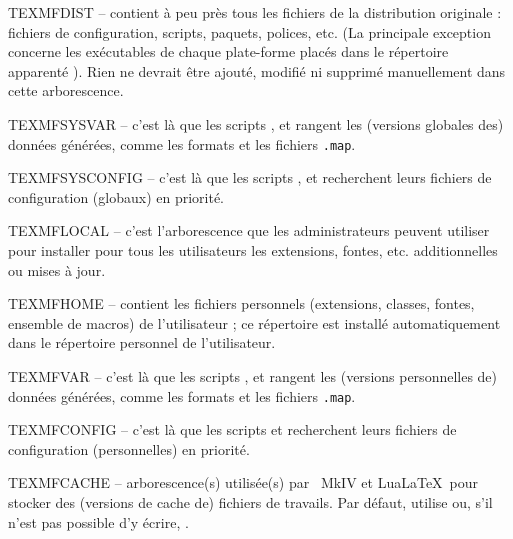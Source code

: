 \documentclass[german, english, french]{article}
\begin{document}
\begin{ttdescription}
\item[TEXMFDIST] -- contient à peu près tous les fichiers de la distribution
  originale : fichiers de configuration, scripts, paquets, polices, etc. (La
  principale exception concerne les exécutables de chaque plate-forme placés
  dans le répertoire apparenté ).  Rien ne devrait être ajouté,
  modifié ni supprimé manuellement dans cette arborescence.
\item[TEXMFSYSVAR] -- c'est là que les scripts ,
   et  rangent les (versions globales
  des) données générées, comme les formats et les fichiers \verb+.map+.
\item[TEXMFSYSCONFIG] -- c'est là que les scripts ,
   et  recherchent leurs fichiers de
  configuration (globaux) en priorité.
\item[TEXMFLOCAL] -- c'est l'arborescence que les administrateurs peuvent
  utiliser pour installer pour tous les utilisateurs les extensions, fontes,
  etc. additionnelles ou mises à jour.
\item[TEXMFHOME] -- contient les fichiers personnels (extensions, classes,
  fontes, ensemble de macros) de l'utilisateur ; ce répertoire est installé
  automatiquement dans le répertoire personnel de l'utilisateur.
\item[TEXMFVAR] -- c'est là que les scripts ,
   et  rangent les (versions
  personnelles de) données générées, comme les formats et les fichiers
  \verb+.map+.
\item[TEXMFCONFIG] -- c'est là que les scripts 
   et  recherchent leurs fichiers de
  configuration (personnelles) en priorité.
\item[TEXMFCACHE] -- arborescence(s) utilisée(s) par \ConTeXt\ MkIV et LuaLaTeX\
  pour stocker des (versions de cache de) fichiers de travails. Par défaut,
  utilise \code{TEXMFSYSVAR} ou, s'il n'est pas possible d'y écrire,
  \code{TEXMFVAR}.
\end{ttdescription}
\end{document}
